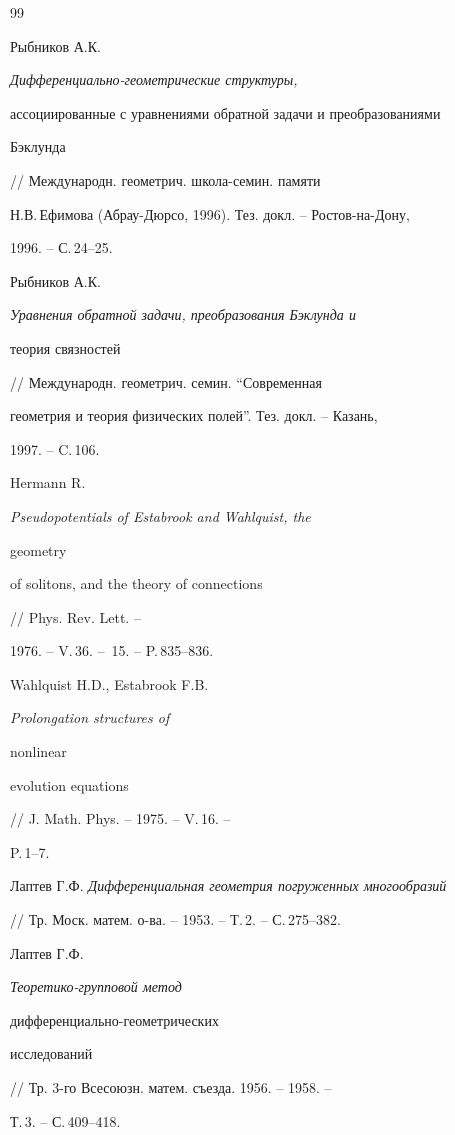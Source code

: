 \begin{thebibliography}{99} 


 




Рыбников А.К. {\em Дифференциально-геометрические структуры, 


ассоциированные с уравнениями обратной задачи и преобразованиями 


Бэклунда} // Международн. геометрич. школа-семин. памяти 


Н.В.\,Ефимова (Абрау-Дюрсо, 1996). Тез. докл. -- Ростов-на-Дону, 


1996. -- С.\,24--25. 




Рыбников А.К. {\em Уравнения обратной задачи, преобразования Бэклунда и 


теория связностей} // Международн. геометрич. семин. ``Современная 


геометрия и теория физических полей''. Тез. докл. -- Казань, 


1997. -- C.\,106. 




Hermann R. {\em Pseudopotentials of Estabrook and Wahlquist, the 


geometry 


of solitons, and the theory of connections} // Phys. Rev. Lett. -- 


1976. -- V.\,36. -- \No\,15. -- P.\,835--836. 




Wahlquist H.D., Estabrook F.B. {\em Prolongation structures of 


nonlinear 


evolution equations} // J. Math. Phys. -- 1975. -- V.\,16. -- 


P.\,1--7. 




Лаптев Г.Ф. {\em Дифференциальная геометрия погруженных многообразий} 


// Тр. Моск. матем. о-ва. -- 1953. -- Т.\,2. -- С.\,275--382. 




Лаптев Г.Ф. {\em Теоретико-групповой метод 


дифференциально-геометрических 


исследований} // Тр. 3-го Всесоюзн. матем. съезда. 1956. -- 1958. -- 


Т.\,3. -- С.\,409--418. 



\end{thebibliography}
